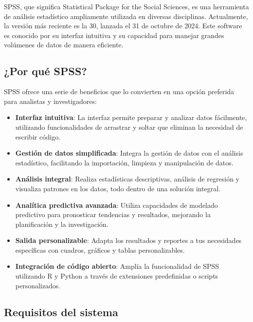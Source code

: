 \documentclass[
  letterpaper,
  DIV=11,
  numbers=noendperiod]{scrreprt}
\begin{document}

SPSS, que significa Statistical Package for the Social Sciences, es una
herramienta de análisis estadístico ampliamente utilizada en diversas
disciplinas. Actualmente, la versión más reciente es la 30, lanzada el
31 de octubre de 2024. Este software es conocido por su interfaz
intuitiva y su capacidad para manejar grandes volúmenes de datos de
manera eficiente.

\subsection*{¿Por qué SPSS?}\label{por-quuxe9-spss}

SPSS ofrece una serie de beneficios que lo convierten en una opción
preferida para analistas y investigadores:

\begin{itemize}
\item
  \textbf{Interfaz intuitiva}: La interfaz permite preparar y analizar
  datos fácilmente, utilizando funcionalidades de arrastrar y soltar que
  eliminan la necesidad de escribir código.
\item
  \textbf{Gestión de datos simplificada}: Integra la gestión de datos
  con el análisis estadístico, facilitando la importación, limpieza y
  manipulación de datos.
\item
  \textbf{Análisis integral}: Realiza estadísticas descriptivas,
  análisis de regresión y visualiza patrones en los datos, todo dentro
  de una solución integral.
\item
  \textbf{Analítica predictiva avanzada}: Utiliza capacidades de
  modelado predictivo para pronosticar tendencias y resultados,
  mejorando la planificación y la investigación.
\item
  \textbf{Salida personalizable}: Adapta los resultados y reportes a tus
  necesidades específicas con cuadros, gráficos y tablas
  personalizables.
\item
  \textbf{Integración de código abierto}: Amplía la funcionalidad de
  SPSS utilizando R y Python a través de extensiones predefinidas o
  scripts personalizados.
\end{itemize}

\subsection*{Requisitos del sistema}\label{requisitos-del-sistema}
\end{document}
